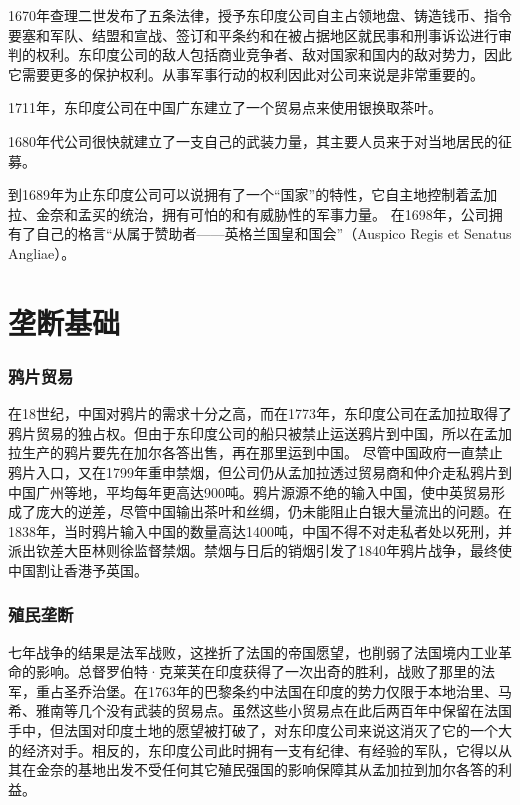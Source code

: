 \documentclass{ctexbook}
\begin{document}
1670年查理二世发布了五条法律，授予东印度公司自主占领地盘、铸造钱币、指令要塞和军队、结盟和宣战、签订和平条约和在被占据地区就民事和刑事诉讼进行审判的权利。东印度公司的敌人包括商业竞争者、敌对国家和国内的敌对势力，因此它需要更多的保护权利。从事军事行动的权利因此对公司来说是非常重要的。

1711年，东印度公司在中国广东建立了一个贸易点来使用银换取茶叶。

1680年代公司很快就建立了一支自己的武装力量，其主要人员来于对当地居民的征募。

到1689年为止东印度公司可以说拥有了一个“国家”的特性，它自主地控制着孟加拉、金奈和孟买的统治，拥有可怕的和有威胁性的军事力量。
在1698年，公司拥有了自己的格言“从属于赞助者——英格兰国皇和国会”（Auspico Regis et Senatus Angliae）。
\section{垄断基础}
\subsubsection{鸦片贸易}
在18世纪，中国对鸦片的需求十分之高，而在1773年，东印度公司在孟加拉取得了鸦片贸易的独占权。但由于东印度公司的船只被禁止运送鸦片到中国，所以在孟加拉生产的鸦片要先在加尔各答出售，再在那里运到中国。
尽管中国政府一直禁止鸦片入口，又在1799年重申禁烟，但公司仍从孟加拉透过贸易商和仲介走私鸦片到中国广州等地，平均每年更高达900吨。鸦片源源不绝的输入中国，使中英贸易形成了庞大的逆差，尽管中国输出茶叶和丝绸，仍未能阻止白银大量流出的问题。在1838年，当时鸦片输入中国的数量高达1400吨，中国不得不对走私者处以死刑，并派出钦差大臣林则徐监督禁烟。禁烟与日后的销烟引发了1840年鸦片战争，最终使中国割让香港予英国。
\subsubsection{殖民垄断}
七年战争的结果是法军战败，这挫折了法国的帝国愿望，也削弱了法国境内工业革命的影响。总督罗伯特·克莱芙在印度获得了一次出奇的胜利，战败了那里的法军，重占圣乔治堡。在1763年的巴黎条约中法国在印度的势力仅限于本地治里、马希、雅南等几个没有武装的贸易点。虽然这些小贸易点在此后两百年中保留在法国手中，但法国对印度土地的愿望被打破了，对东印度公司来说这消灭了它的一个大的经济对手。相反的，东印度公司此时拥有一支有纪律、有经验的军队，它得以从其在金奈的基地出发不受任何其它殖民强国的影响保障其从孟加拉到加尔各答的利益。
\end{document}
